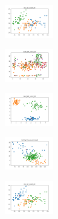 \vspace*{\fill}
\newpage
\vspace*{\fill}

\begin{figure}[H]    
    \centering
    \begin{subfigure}
        \centering
        \includegraphics[width=0.234\textwidth]{img/am01mej/iris_set_const_20_949004259_clust.png}
    \end{subfigure}
    \hfill
    \begin{subfigure}
        \centering
        \includegraphics[width=0.234\textwidth]{img/am01mej/ecoli_set_const_20_949004259_clust.png}
    \end{subfigure}
    \hfill
    \begin{subfigure}
        \centering
        \includegraphics[width=0.234\textwidth]{img/am01mej/rand_set_const_20_949004259_clust.png}
    \end{subfigure}
    \hfill
    \begin{subfigure}
        \centering
        \includegraphics[width=0.234\textwidth]{img/am01mej/newthyroid_set_const_20_949004259_clust.png}
    \end{subfigure}
    \hfill
    \begin{subfigure}
        \centering
        \includegraphics[width=0.234\textwidth]{img/am01mej/iris_set_const_20_589741062_clust.png}

\end{subfigure}
\end{figure}

